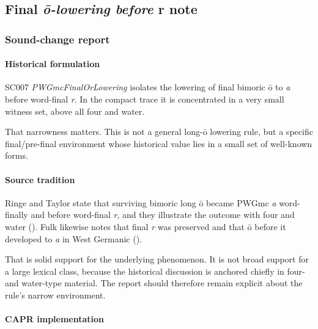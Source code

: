 \documentclass[
  british,
  a4paper,
]{article}
\begin{document}
\subsection{\texorpdfstring{Final \emph{ō-lowering before }r
note}{Final ō-lowering before r note}}\label{final-ux14d-lowering-before-r-note}

\subsubsection{Sound-change report}\label{sound-change-report-4}

\paragraph{Historical formulation}\label{historical-formulation-4}

SC007 \emph{PWGmcFinalOrLowering} isolates the lowering of final bimoric
ō to \emph{a} before word-final \emph{r}. In the compact trace it is
concentrated in a very small witness set, above all four and water.

That narrowness matters. This is not a general long-ō lowering rule, but
a specific final/pre-final environment whose historical value lies in a
small set of well-known forms.

\paragraph{Source tradition}\label{source-tradition-4}

Ringe and Taylor state that surviving bimoric long ō became PWGmc
\emph{a} word-finally and before word-final \emph{r}, and they
illustrate the outcome with four and water
(). Fulk
likewise notes that final \emph{r} was preserved and that ō before it
developed to \emph{a} in West Germanic ().

That is solid support for the underlying phenomenon. It is not broad
support for a large lexical class, because the historical discussion is
anchored chiefly in four- and water-type material. The report should
therefore remain explicit about the rule's narrow environment.

\paragraph{CAPR implementation}\label{capr-implementation-4}
\end{document}
